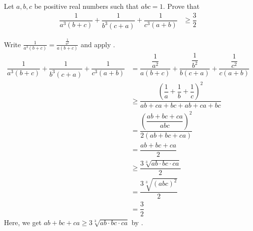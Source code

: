 \documentclass{subfile}
\begin{document}
		\begin{problem}
			Let $a,b,c$ be positive real numbers such that $abc=1$. Prove that
				\begin{align*}
					\dfrac{1}{a^{3}(b+c)}+\dfrac{1}{b^{3}(c+a)}+\dfrac{1}{c^{3}(a+b)}
						& \geq \dfrac{3}{2}
				\end{align*}
				
				\begin{solution}
					Write $\frac{1}{a^{3}(b+c)}=\frac{\frac{1}{a^{2}}}{a(b+c)}$ and apply .
						\begin{align*}
							\dfrac{1}{a^{3}(b+c)}+\dfrac{1}{b^{3}(c+a)}+\dfrac{1}{c^{3}(a+b)}
								& = \dfrac{\dfrac{1}{a^{2}}}{a(b+c)}+\dfrac{\dfrac{1}{b^{2}}}{b(c+a)}+\dfrac{\dfrac{1}{c^{2}}}{c(a+b)}\\
								& \geq \dfrac{\left(\dfrac{1}{a}+\dfrac{1}{b}+\dfrac{1}{c}\right)^{2}}{ab+ca+bc+ab+ca+bc}\\
								& = \dfrac{\left(\dfrac{ab+bc+ca}{abc}\right)^{2}}{2(ab+bc+ca)}\\
								& = \dfrac{ab+bc+ca}{2}\\
								& \geq \dfrac{3\sqrt[3]{ab\cdot bc\cdot ca}}{2}\\
								& = \dfrac{3\sqrt[3]{(abc)^{2}}}{2}\\
								& = \dfrac{3}{2}
						\end{align*}
					Here, we get $ab+bc+ca\geq3\sqrt[3]{ab\cdot bc\cdot ca}$ by .
				\end{solution}
		\end{problem}
	
\end{document}
